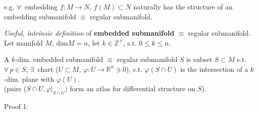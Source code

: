 e.g. $\forall \, $ embedding $f: M \to N$, $f(M) \subset N$ naturally has the structure of an embedding submanifold $\equiv $ regular submanifold.

\emph{Useful, intrinsic definition} of \textbf{embedded submanifold} $\equiv$ regular submanifold. \\
Let manifold $M$, $\text{dim}M = n$, let $k \in \mathbb{Z}^+$, s.t. $0\leq k \leq n$.

A $k$-dim. embedded submanifold $\equiv $ regular submanifold $S$ is subset $S \subset M$ s.t. $\forall \, p \in S$, $\exists \, $ chart ($U\subset M, \, \varphi : U \to \mathbb{R}^n \ni 0$), s.t. $\varphi(S \cap U)$ is the intersection of a $k$-dim. plane with $\varphi(U)$.  \\
 (pairs ($S\cap U, \left. \varphi \right|_{S \cap U})$ form an atlas for differential structure on $S$).

Proof 1:

